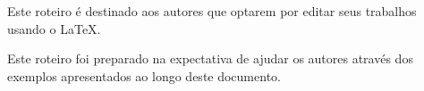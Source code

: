 

\noindent%
Este roteiro é destinado aos autores que optarem por editar seus trabalhos usando o \LaTeX .

\noindent%
Este roteiro foi preparado na expectativa de ajudar os autores através dos exemplos apresentados ao longo deste documento.

\noindent%
\lipsum[2-4]

